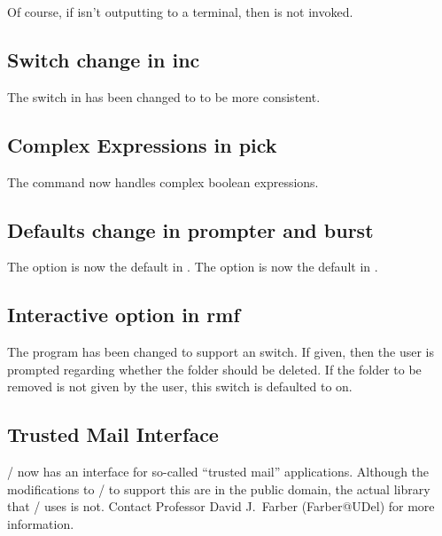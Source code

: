 Of course,
if  isn't outputting to a terminal,
then  is not invoked.

\subsection*	{Switch change in inc}
The  switch in  has been changed to
 to be more consistent.

\subsection*	{Complex Expressions in pick}
The  command now handles complex boolean expressions.

\subsection*	{Defaults change in prompter and burst}
The  option is now the default in .
The  option is now the default in .

\subsection*	{Interactive option in rmf}
The  program has been changed to support an 
switch.
If given,
then the user is prompted regarding whether the folder should be deleted.
If the folder to be removed is not given by the user,
this switch is defaulted to on.

\subsection*	{Trusted Mail Interface}
\MH/ now has an interface for so-called ``trusted mail'' applications.
Although the modifications to \MH/ to support this are in the public domain,
the actual library that \MH/ uses is not.
Contact Professor David J.~Farber ({\sf Farber@UDel\/}) for more information.



\showsummary


